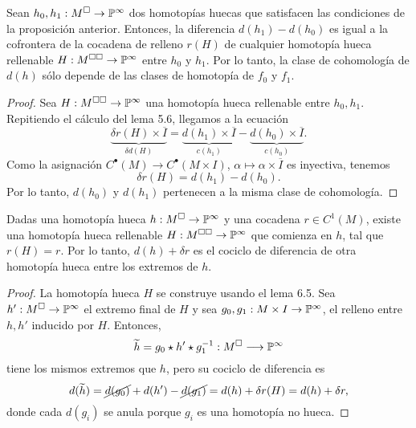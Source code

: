 \begin{lemma}
Sean $h_0, h_1 : M^\square \to \P^\infty$ dos homotopías huecas que satisfacen las condiciones de la proposición anterior. Entonces, la diferencia $d(h_1) - d(h_0)$ es igual a la cofrontera de la cocadena de relleno $r(H)$ de cualquier homotopía hueca rellenable $H : M^{\square \square} \to \P^\infty$ entre $h_0$ y $h_1$. Por lo tanto, la clase de cohomología de $d(h)$ sólo depende de las clases de homotopía de $f_0$ y $f_1$.
\end{lemma}

\begin{proof}
Sea $H : M^{\square \square} \to \P^\infty$ una homotopía hueca rellenable entre $h_0, h_1$. Repitiendo el cálculo del lema 5.6, llegamos a la ecuación
$$
\underbrace {\delta r(H) \times \overline I}_{\delta d(H)}
    = \underbrace {d(h_1) \times \overline I}_{c(h_1)}
    - \underbrace {d(h_0) \times \overline I}_{c(h_0)}.
$$
Como la asignación $C^\bullet(M) \to C^\bullet(M \times I)$, $\alpha \mapsto \alpha \times \overline I$ es inyectiva, tenemos
$$\delta r(H) = d(h_1) - d(h_0).$$
Por lo tanto, $d(h_0)$ y $d(h_1)$ pertenecen a la misma clase de cohomología.
\end{proof}

\begin{lemma}
Dadas una homotopía hueca $h : M^\square \to \P^\infty$ y una cocadena $r \in C^1(M)$, existe una homotopía hueca rellenable $H : M^{\square \square} \to \P^\infty$ que comienza en $h$, tal que $r(H) = r$. Por lo tanto, $d(h) + \delta r$ es el cociclo de diferencia de otra homotopía hueca entre los extremos de $h$.
\end{lemma}

\begin{proof}
La homotopía hueca $H$ se construye usando el lema 6.5. Sea $h' : M^\square \to \P^\infty$ el extremo final de $H$ y sea $g_0, g_1 : M \times I \to \P^\infty$, el relleno entre $h, h'$ inducido por $H$. Entonces,
$$\widetilde h = g_0 \star h' \star g_1^{-1} : M^\square \longrightarrow \P^\infty$$
tiene los mismos extremos que $h$, pero su cociclo de diferencia es
$$
d(\widetilde h)
    = \cancel {d(g_0)} + d(h') - \cancel {d(g_1)}
    = d(h) + \delta r(H)
    = d(h) + \delta r,
$$
donde cada $d(g_i)$ se anula porque $g_i$ es una homotopía no hueca.
\end{proof}
